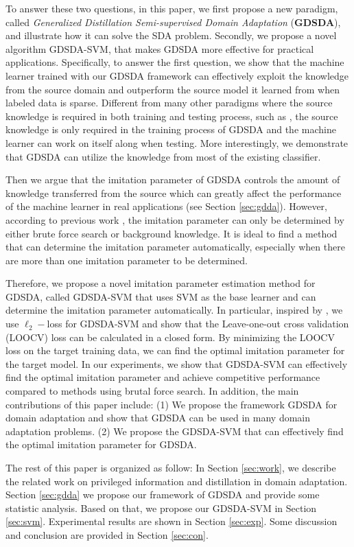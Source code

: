 To answer these two questions, in this paper, we first propose a new paradigm, called \textit{Generalized Distillation Semi-supervised Domain Adaptation} (\textbf{GDSDA}), and illustrate how it can solve the SDA problem. Secondly, we propose a novel algorithm GDSDA-SVM, that makes GDSDA more effective for practical applications. Specifically, to answer the first question, we show that the machine learner trained with our GDSDA framework can effectively exploit the knowledge from the source domain and outperform the source model it learned from when labeled data is sparse.
Different from many other paradigms where the source knowledge is required in both training and testing process, such as \cite{kuzborskij2013stability}, the source knowledge is only required in the training process of GDSDA and the machine learner can work on itself along when testing. More interestingly, we demonstrate that GDSDA can utilize the knowledge from most of the existing classifier.

Then we argue that the imitation parameter of GDSDA controls the amount of knowledge transferred from the source which can greatly affect the performance of the machine learner in real applications (see Section \ref{sec:gdda}).
However, according to previous work \cite{lopez2015unifying,Tzeng_2015_ICCV}, the imitation parameter can only be determined by either brute force search or background knowledge. It is ideal to find a method that can determine the imitation parameter automatically, especially when there are more than one imitation parameter to be determined.

Therefore, we propose a novel imitation parameter estimation method for GDSDA, called GDSDA-SVM that uses SVM as the base learner and can determine the imitation parameter automatically. In particular, inspired by \cite{cawley2006leave}, we use $\ell_2-$loss for GDSDA-SVM and show that the Leave-one-out cross validation (LOOCV) loss can be calculated in a closed form. By minimizing the LOOCV loss on the target training data, we can find the optimal imitation parameter for the target model. In our experiments, we show that GDSDA-SVM can effectively find the optimal imitation parameter and achieve competitive performance compared to methods using brutal force search. In addition, the main contributions of this paper include: (1) We propose the framework GDSDA for domain adaptation and show that GDSDA can be used in many domain adaptation problems. (2) We propose the GDSDA-SVM that can effectively find the optimal imitation parameter for GDSDA.

The rest of this paper is organized as follow: In Section \ref{sec:work}, we describe the related work on privileged information and distillation in domain adaptation. Section \ref{sec:gdda} we propose our framework of GDSDA and provide some statistic analysis. Based on that, we propose our GDSDA-SVM in Section \ref{sec:svm}. Experimental results are shown in Section \ref{sec:exp}. Some discussion and conclusion are provided in Section \ref{sec:con}.